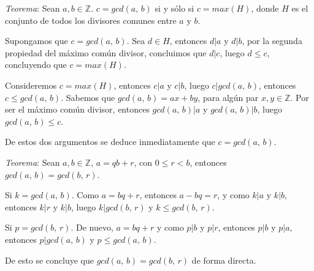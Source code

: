 \documentclass{article}
\newcommand{\pair}[2]{(#1,\, #2)}
\newcommand{\g}[2]{\textit{gcd}\pair{#1}{#2}}
\newcommand{\m}[1]{\textit{max}(#1)}
\begin{document}
  \textit{Teorema}: Sean $a, b \in \mathbb{Z}$. $c = \g{a}{b}$ si y sólo si 
  $c = \m{H}$, donde $H$ es el conjunto de todos los divisores comunes entre 
  $a$ y $b$.
  \newline\newline

  Supongamos que $c = \g{a}{b}$. Sea $d \in H$, entonces $d|a$ y $d|b$, por la segunda 
  propiedad del máximo común divisor, concluimos que $d|c$, luego $d \leq c$, 
  concluyendo que $c = \m{H}$.
  \newline\newline

  Consideremos $c = \m{H}$, entonces $c|a$ y $c|b$, luego $c|\g{a}{b}$, entonces 
  $c \leq \g{a}{b}$.
  \newline
  Sabemos que $\g{a}{b} = ax + by$, para algún par $x, y \in \mathbb{Z}$. Por ser el máximo
  común divisor, entonces $\g{a}{b}|a$ y $\g{a}{b}|b$, luego $\g{a}{b} \leq c$.
  \newline

  De estos dos argumentos se deduce inmediatamente que $c = \g{a}{b}$.
  \newline\newline

  \textit{Teorema}: Sean $a, b \in \mathbb{Z}$, $a = qb + r$, con $0 \leq r < b$,
  entonces $\g{a}{b} = \g{b}{r}$.
  \newline\newline

  Si $k = \g{a}{b}$. Como $a = bq + r$, entonces $a - bq = r$, y como 
  $k|a$ y $k|b$, entonces $k|r$ y $k|b$, luego $k | \g{b}{r}$ y $k \leq \g{b}{r}$.
  \newline

  Si $p = \g{b}{r}$. De nuevo, $a = bq + r$ y como $p|b$ y $p|r$, entonces 
  $p|b$ y $p|a$, entonces $p|\g{a}{b}$ y $p \leq \g{a}{b}$.
  \newline\newline

  De esto se concluye que $\g{a}{b} = \g{b}{r}$ de forma directa.
\end{document}
